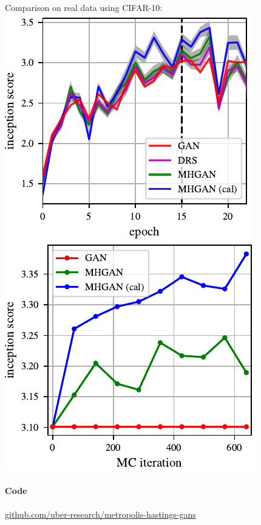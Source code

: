 \documentclass[a0,landscape]{a0poster}
\begin{document}
\begin{multicols}{3}
Comparison on real data using CIFAR-10:\\
\includegraphics[scale=2.5]{../figures/per_epoch.pdf}
\includegraphics[scale=2.5]{../figures/plot_per_mh.pdf}

\paragraph{Code}
\centering
\large {\url{github.com/uber-research/metropolis-hastings-gans}}

\end{multicols}
\end{document}

